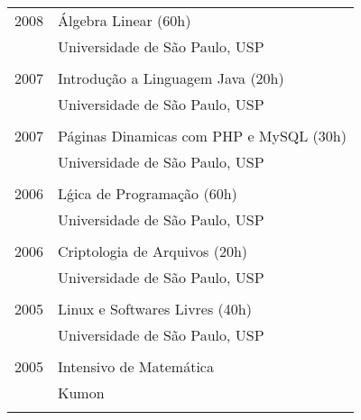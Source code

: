\documentclass[a4paper, oneside, final]{scrartcl}
\begin{document}
\begin{tabularx}{0.97\linewidth}{p{2cm}X}

2008  & Álgebra Linear (60h)\\
      & Universidade de São Paulo, USP\\ \\

2007  & Introdução a Linguagem Java (20h)\\
      & Universidade de São Paulo, USP\\ \\

2007  & Páginas Dinamicas com PHP e MySQL (30h)\\
      & Universidade de São Paulo, USP\\ \\

2006  & Lǵica de Programação (60h)\\
      & Universidade de São Paulo, USP\\ \\

2006  & Criptologia de Arquivos (20h)\\
      & Universidade de São Paulo, USP\\ \\

2005  & Linux e Softwares Livres (40h)\\
      & Universidade de São Paulo, USP\\ \\

2005  & Intensivo de Matemática\\
      & Kumon\\ \\

\end{tabularx}

%
\end{document}
